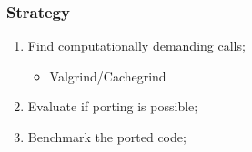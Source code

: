 
\begin{frame}
	\frametitle{Strategy}
	\begin{enumerate}
		\item Find computationally demanding calls;
			\begin{itemize}
				\item Valgrind/Cachegrind
			\end{itemize}
		\item Evaluate if porting is possible;
		\item Benchmark the ported code;
	\end{enumerate}
\end{frame}
